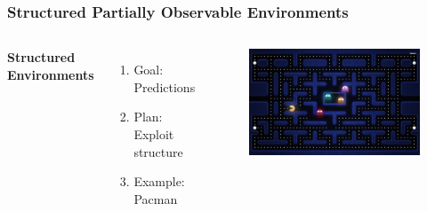 \documentclass{beamer}
\begin{document}
\begin{frame}
\frametitle{Structured Partially Observable Environments}
\begin{columns}[c] %

\textbf{Structured Environments}
\begin{enumerate}
\item Goal: Predictions
\item Plan: Exploit structure
\item Example: Pacman

\end{enumerate}

\begin{figure}
\includegraphics[width=1.0\linewidth]{lucasplots/pac-man.jpg}
\end{figure}

\end{columns}
\end{frame}

\end{document}
